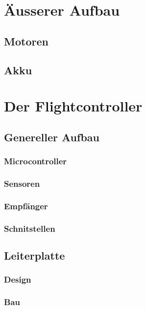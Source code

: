 \documentclass[12pt,a4paper, ngerman]{article}
\begin{document}
\section{Äusserer Aufbau}
\subsection{Motoren}
\subsection{Akku}

\section{Der Flightcontroller}

\subsection{Genereller Aufbau}

\subsubsection{Microcontroller}

\subsubsection{Sensoren}

\subsubsection{Empfänger}

\subsubsection{Schnitstellen}


\subsection{Leiterplatte}

\subsubsection{Design}

\subsubsection{Bau}
\end{document}
